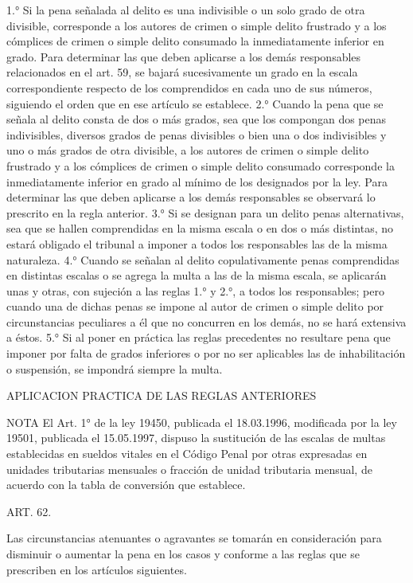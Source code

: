     1.° Si la pena señalada al delito es una indivisible o un solo grado de otra divisible, corresponde a los autores de crimen o simple delito frustrado y a los cómplices de crimen o simple delito consumado la inmediatamente inferior en grado.
    Para determinar las que deben aplicarse a los demás responsables relacionados en el art. 59, se bajará sucesivamente un grado en la escala correspondiente respecto de los comprendidos en cada uno de sus números, siguiendo el orden que en ese artículo se establece.
    2.° Cuando la pena que se señala al delito consta de dos o más grados, sea que los compongan dos penas indivisibles, diversos grados de penas divisibles o bien una o dos indivisibles y uno o más grados de otra divisible, a los autores de crimen o simple delito frustrado y a los cómplices de crimen o simple delito consumado corresponde la inmediatamente inferior en grado al mínimo de los designados por la ley.
    Para determinar las que deben aplicarse a los demás responsables se observará lo prescrito en la regla anterior.
    3.° Si se designan para un delito penas alternativas, sea que se hallen comprendidas en la misma escala o en dos o más distintas, no estará obligado el tribunal a imponer a todos los responsables las de la misma naturaleza.
    4.° Cuando se señalan al delito copulativamente penas comprendidas en distintas escalas o se agrega la multa a las de la misma escala, se aplicarán unas y otras, con sujeción a las reglas 1.° y 2.°, a todos los responsables; pero cuando una de dichas penas se impone al autor de crimen o simple delito por circunstancias peculiares a él que no concurren en los demás, no se hará extensiva a éstos.
    5.°  Si al poner en práctica las reglas precedentes no resultare pena que imponer por falta de grados inferiores o por no ser aplicables las de inhabilitación o suspensión, se impondrá siempre la multa.

    APLICACION PRACTICA DE LAS REGLAS ANTERIORES 




NOTA
      El Art. 1° de la ley 19450, publicada el 18.03.1996, modificada por la ley 19501, publicada el 15.05.1997, dispuso la sustitución de las escalas de multas establecidas en sueldos vitales en el Código Penal por otras expresadas en unidades tributarias mensuales o fracción de unidad tributaria mensual, de acuerdo con la tabla de conversión que establece.

    ART. 62.

    Las circunstancias atenuantes o agravantes se tomarán en consideración para disminuir o aumentar la pena en los casos y conforme a las reglas que se prescriben en los artículos siguientes.




